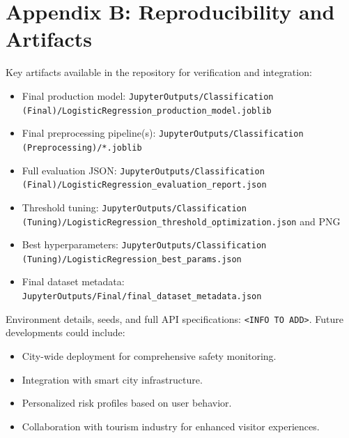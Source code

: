 \documentclass{article}
\begin{document}
\section{Appendix B: Reproducibility and Artifacts}
Key artifacts available in the repository for verification and integration:
\begin{itemize}
	\item Final production model: \texttt{JupyterOutputs/Classification (Final)/LogisticRegression\_production\_model.joblib}
	\item Final preprocessing pipeline(s): \texttt{JupyterOutputs/Classification (Preprocessing)/*.joblib}
	\item Full evaluation JSON: \texttt{JupyterOutputs/Classification (Final)/LogisticRegression\_evaluation\_report.json}
	\item Threshold tuning: \texttt{JupyterOutputs/Classification (Tuning)/LogisticRegression\_threshold\_optimization.json} and PNG
	\item Best hyperparameters: \texttt{JupyterOutputs/Classification (Tuning)/LogisticRegression\_best\_params.json}
	\item Final dataset metadata: \texttt{JupyterOutputs/Final/final\_dataset\_metadata.json}
\end{itemize}

Environment details, seeds, and full API specifications: \texttt{<INFO TO ADD>}.
Future developments could include:
\begin{itemize}
\item City-wide deployment for comprehensive safety monitoring.
\item Integration with smart city infrastructure.
\item Personalized risk profiles based on user behavior.
\item Collaboration with tourism industry for enhanced visitor experiences.
\end{itemize}
\end{document}
